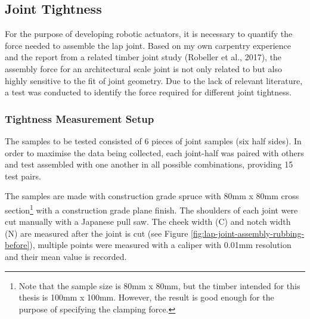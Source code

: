 \subsection{Joint Tightness}
\label{subsection:exploration-1-joint-tightness}

For the purpose of developing robotic actuators, it is necessary to quantify the force needed to assemble the lap joint. Based on my own carpentry experience and the report from a related timber joint study (Robeller et al., 2017), the assembly force for an architectural scale joint is not only related to but also highly sensitive to the fit of joint geometry. Due to the lack of relevant literature, a test was conducted to identify the force required for different joint tightness.

\subsubsection{Tightness Measurement Setup}

The samples to be tested consisted of 6 pieces of joint samples (six half sides). In order to maximise the data being collected, each joint-half was paired with others and test assembled with one another in all possible combinations, providing 15 test pairs.

The samples are made with construction grade spruce with 80mm x 80mm cross section\footnote{Note that the sample size is 80mm x 80mm, but the timber intended for this thesis is 100mm x 100mm. However, the result is good enough for the purpose of specifying the clamping force.} with a construction grade plane finish.
The shoulders of each joint were cut manually with a Japanese pull saw. The cheek width (C) and notch width (N) are measured after the joint is cut (see Figure \ref{fig:lap-joint-assembly-rubbing-before}), multiple points were measured with a caliper with 0.01mm resolution and their mean value is recorded.

